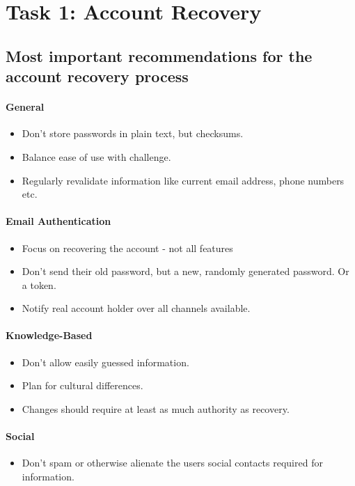 \section{Task 1: Account Recovery}

\subsection{Most important recommendations for the account recovery process}

\paragraph{General}
\begin{itemize}
	\item Don't store passwords in plain text, but checksums.
	\item Balance ease of use with challenge.
	\item Regularly revalidate information like current email address, phone numbers etc.
\end{itemize}

\paragraph{Email Authentication}
\begin{itemize}
	\item Focus on recovering the account - not all features
	\item Don't send their old password, but a new, randomly generated password. Or a token.
	\item Notify real account holder over all channels available.
\end{itemize}

\paragraph{Knowledge-Based}
\begin{itemize}
	\item Don't allow easily guessed information.
	\item Plan for cultural differences.
	\item Changes should require at least as much authority as recovery.
\end{itemize}

\paragraph{Social}
\begin{itemize}
	\item Don't spam or otherwise alienate the users social contacts required for information.
\end{itemize}

